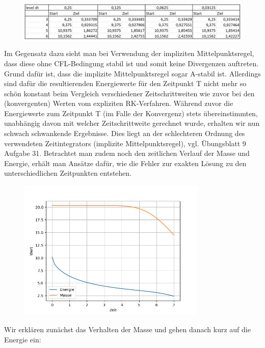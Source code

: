 \begin{figure}[H]
	\centering
	\includegraphics[width=\textwidth]{../Aufgabe21/rkorder-2RiemannEnergieTabelle.png}

\end{figure}
Im Gegensatz dazu sieht man bei Verwendung der impliziten Mittelpunktsregel, dass diese ohne CFL-Bedingung stabil ist und somit keine Divergenzen auftreten. Grund dafür ist, dass die implizite Mittelpunktsregel sogar A-stabil ist.
Allerdings sind dafür die resultierenden Energiewerte für den Zeitpunkt T nicht mehr so schön konstant beim Vergleich verschiedener Zeitschrittweiten wie zuvor bei den (konvergenten) Werten vom expliziten RK-Verfahren.
Während zuvor die Energiewerte zum Zeitpunkt T (im Falle der Konvergenz) stets übereinstimmten, unabhängig davon mit welcher Zeitschrittweite gerechnet wurde, erhalten wir nun schwach schwankende Ergebnisse. Dies liegt an der schlechteren Ordnung des verwendeten Zeitintegrators (implizite Mittelpunktsregel), vgl. Übungsblatt 9 Aufgabe 31.
Betrachtet man zudem noch den zeitlichen Verlauf der Masse und Energie, erhält man Ansätze dafür, wie die Fehler zur exakten Lösung zu den unterschiedlichen Zeitpunkten entstehen.
\begin{figure}[H]
	\centering
    \includegraphics[width=0.8\textwidth]{../Aufgabe21/zeitverlauf.png}
\end{figure}
Wir erklären zunächst das Verhalten der Masse und gehen danach kurz auf die Energie ein:

